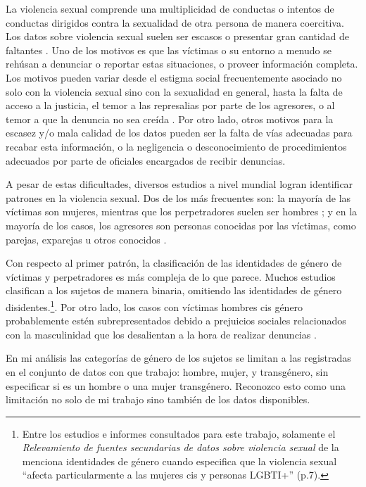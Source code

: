 \documentclass[10 pt]{article}
\begin{document}
La violencia sexual comprende una multiplicidad de conductas o intentos de conductas dirigidos contra la sexualidad de otra persona de manera coercitiva. Los datos sobre violencia sexual suelen ser escasos o presentar gran cantidad de faltantes \citetext{\citealp[p.~150]{ferris2002world}}. Uno de los motivos es que las víctimas o su entorno a menudo se rehúsan a denunciar o reportar estas situaciones, o proveer información completa. Los motivos pueden variar desde el estigma social frecuentemente asociado no solo con la violencia sexual sino con la sexualidad en general, hasta la falta de acceso a la justicia, el temor a las represalias por parte de los agresores, o al temor a que la denuncia no sea creída \citetext{\citealp{murphy2022unfounded}}. Por otro lado, otros motivos para la escasez y/o mala calidad de los datos pueden ser la falta de vías adecuadas para recabar esta información, o la negligencia o desconocimiento de procedimientos adecuados por parte de oficiales encargados de recibir denuncias. 

A pesar de estas dificultades, diversos estudios a nivel mundial logran identificar patrones en la violencia sexual. Dos de los más frecuentes son: la mayoría de las víctimas son mujeres, mientras que los perpetradores suelen ser hombres \citetext{\citealp[p.~149]{ferris2002world}; \citealp[p.~15]{contreras2016violencia}}; y en la mayoría de los casos, los agresores son personas conocidas por las víctimas, como parejas, exparejas u otros conocidos \citetext{\citealp[p.~9]{garcia2005multi},\citealp[p.~22]{unicef2018analisis}, \citealp[p.~151]{ferris2002world}}.
 
Con respecto al primer patrón, la clasificación de las identidades de género de víctimas y perpetradores es más compleja de lo que parece. Muchos estudios clasifican a los sujetos de manera binaria, omitiendo las identidades de género disidentes.\footnote{Entre los estudios e informes consultados para este trabajo, solamente el \textit{Relevamiento de fuentes secundarias de datos sobre violencia sexual} de la \citet{ufem_relevamiento} menciona identidades de género cuando especifica que la violencia sexual “afecta particularmente a las mujeres cis y personas LGBTI+” (p.7).}. Por otro lado, los casos con víctimas hombres cis género probablemente estén subrepresentados debido a prejuicios sociales relacionados con la masculinidad que los desalientan a la hora de realizar denuncias \citep*[p.~149]{ferris2002world}. 

En mi análisis las categorías de género de los sujetos se limitan a las registradas en el conjunto de datos con que trabajo: hombre, mujer, y transgénero, sin especificar si es un hombre o una mujer transgénero. Reconozco esto como una limitación no solo de mi trabajo sino también de los datos disponibles. 
\end{document}
